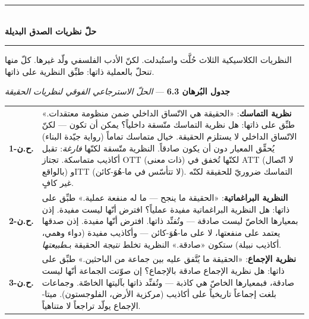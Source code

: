 \documentclass[10pt, openany, oneside]{book}
\renewcommand{\normalsize}{\fontsize{10}{13}\selectfont}
\renewcommand{\footnotesize}{\fontsize{8.5}{11}\selectfont}
\begin{document}
\vspace{0.5em}


\begin{center}
    \rule{0.3\textwidth}{0.4pt}\\[0.5em]
    {\normalsize\bfseries حلّ نظريات الصدق البديلة}\\[0.3em]
    \rule{0.3\textwidth}{0.4pt}
\end{center}

\vspace{1em}

\noindent النظريات الكلاسيكية الثلاث حُلَّت واستُبدلت. لكنّ الأدب الفلسفي ولّد غيرها. كلّ منها تنحلّ بالعملية ذاتها: طبِّق النظرية على ذاتها.

\vspace{0.5em}

\textbf{جدول البُرهان 6.3} --- \textit{الحلّ الاسترجاعي الفوقي لنظريات الحقيقة}

\vspace{0.5em}

{\footnotesize
\noindent\begin{tabular}{r p{}}
\textbf{ح.ن-1.} & \textbf{نظرية التماسك}: «الحقيقة هي الاتّساق الداخلي ضمن منظومة معتقدات.» طبِّق على ذاتها: هل نظرية التماسك متّسقة داخلياً؟ يمكن أن تكون --- لكنّ الاتّساق الداخلي لا يستلزم الحقيقة. خيال متماسك تماماً (رواية جيّدة البناء) يُحقِّق المعيار دون أن يكون صادقاً. النظرية متّسقة لكنّها \textit{فارغة}: تقبل أكاذيب متماسكة. تجتاز OTT (ذات معنى) لكنّها تُخفق في ATT (لا اتّصال بالواقع) وITT (لا تتأسّس في ما-هُوَ-كائن). التماسك ضروريّ للحقيقة لكنّه غير كافٍ. \\[0.5em]
\textbf{ح.ن-2.} & \textbf{النظرية البراغماتية}: «الحقيقة ما ينجح --- ما له منفعة عملية.» طبِّق على ذاتها: هل النظرية البراغماتية مفيدة عملياً؟ افترض أنّها ليست مفيدة. إذن بمعيارها الخاصّ ليست صادقة --- وتُفنِّد ذاتها. افترض أنّها مفيدة. إذن صدقها يعتمد على منفعتها، لا على ما-هُوَ-كائن --- وأكاذيب مفيدة (دواء وهمي، أكاذيب نبيلة) ستكون «صادقة.» النظرية تخلط \textit{نتيجة} الحقيقة بـ\textit{طبيعتها}. \\[0.5em]
\textbf{ح.ن-3.} & \textbf{نظرية الإجماع}: «الحقيقة ما يُتَّفق عليه بين جماعة من الباحثين.» طبِّق على ذاتها: هل نظرية الإجماع صادقة بالإجماع؟ إن صوّتت الجماعة أنّها ليست صادقة، فبمعيارها الخاصّ هي كاذبة --- وتُفنِّد ذاتها بآليتها الخاصّة. وجماعات بلغت إجماعاً تاريخياً على أكاذيب (مركزية الأرض، الفلوجستون). ميتا-الإجماع يولّد تراجعاً لا متناهياً. \\[0.3em]
\end{tabular}
}
\end{document}
